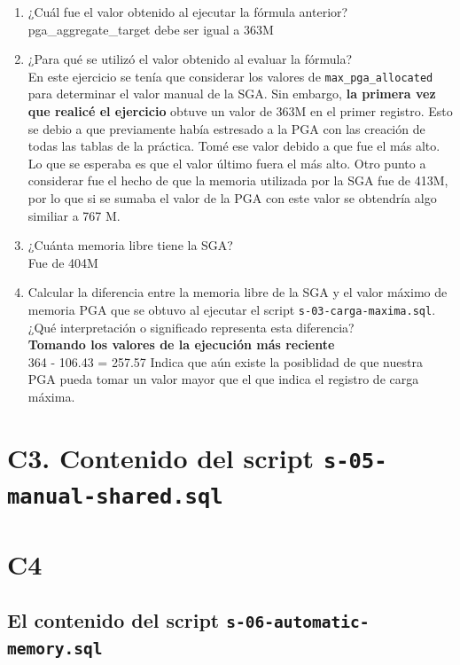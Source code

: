 \documentclass{article}
\begin{document}
\begin{enumerate}[label=\Alph*.]
  \item ¿Cuál fue el valor obtenido al ejecutar la fórmula anterior?\\[4mm]
  pga\_aggregate\_target debe ser igual a 363M
  \item ¿Para qué se utilizó el valor obtenido al evaluar la fórmula?\\[4mm]
    En este ejercicio se tenía que considerar los valores de
    \texttt{max\_pga\_allocated} para determinar el valor manual de la SGA. Sin
    embargo, \textbf{la primera vez que realicé el ejercicio} obtuve un valor de
    363M en el primer registro. Esto se debio a que previamente había estresado
    a la PGA con las creación de todas las tablas de la práctica.
    Tomé ese valor debido a que fue el más alto. Lo que se esperaba es que el
    valor último fuera el más alto. 
    Otro punto a considerar fue el hecho de que la memoria utilizada por la SGA
    fue de 413M, por lo que si se sumaba el valor de la PGA con este valor se
    obtendría algo similiar a 767 M.
  \item ¿Cuánta memoria libre tiene la SGA?\\[4mm]
    Fue de 404M
  \item Calcular la diferencia entre la memoria libre de la SGA y el valor 
    máximo de memoria PGA que se obtuvo al ejecutar el script 
    \texttt{s-03-carga-maxima.sql}. ¿Qué interpretación o significado representa 
    esta diferencia? \\[4mm]
    \textbf{Tomando los valores de la ejecución más reciente} \\
    364 - 106.43 = 257.57
    Indica que aún existe la posiblidad de que nuestra PGA pueda tomar un valor 
    mayor que el que indica el registro de carga máxima.
\end{enumerate}
\section*{C3. Contenido del script \texttt{s-05-manual-shared.sql}}



\section*{C4}

\subsection*{El contenido del script \texttt{s-06-automatic-memory.sql} }
\end{document}
